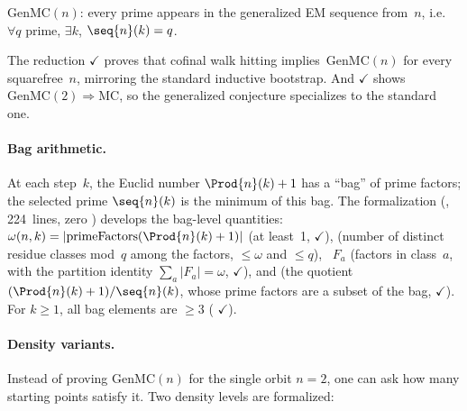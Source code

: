 \begin{definition}
$\mathrm{GenMC}(n)$: every prime appears in the generalized EM
sequence from~$n$, i.e.\ $\forall q$ prime, $\exists k$,
$\seq{n}(k) = q$.
\end{definition}

The reduction
{\color{leanink}$\checkmark$} proves that cofinal walk hitting
implies~$\mathrm{GenMC}(n)$ for every squarefree~$n$, mirroring the
standard inductive bootstrap.  And
{\color{leanink}$\checkmark$} shows $\mathrm{GenMC}(2) \Rightarrow
\mathrm{MC}$, so the generalized conjecture specializes to the
standard one.

\paragraph{Bag arithmetic.}
At each step~$k$, the Euclid number $\Prod{n}(k)+1$ has a ``bag'' of
prime factors; the selected prime $\seq{n}(k)$ is the minimum of this
bag.  The formalization
(, 224~lines, zero )
develops the bag-level quantities:
~$\omega(n,k) = |\text{primeFactors}(\Prod{n}(k)+1)|$
(at least~1,
{\color{leanink}$\checkmark$}),
 (number of distinct residue classes mod~$q$
among the factors, $\leq \omega$ and $\leq q$),
~$F_a$ (factors in class~$a$, with the
partition identity
$\sum_a |F_a| = \omega$,
{\color{leanink}$\checkmark$}),
and  (the quotient
$(\Prod{n}(k)+1)/\seq{n}(k)$, whose prime factors are a subset of
the bag,
{\color{leanink}$\checkmark$}).
For $k \geq 1$, all bag elements are $\geq 3$
(
{\color{leanink}$\checkmark$}).

\paragraph{Density variants.}
Instead of proving $\mathrm{GenMC}(n)$ for the single orbit $n = 2$,
one can ask how many starting points satisfy it.  Two density levels
are formalized:

